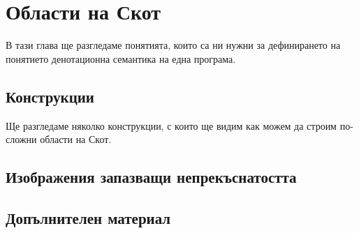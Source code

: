 \chapter{Области на Скот}


В тази глава ще разгледаме понятията, които са ни нужни за дефинирането на понятието денотационна семантика на една програма.



\section{Конструкции}

Ще разгледаме няколко конструкции, с които ще видим как можем да строим по-сложни области на Скот.











% 

% 







\section{Изображения запазващи непрекъснатостта}










% 
% 

\newpage
\section{Допълнителен материал}




